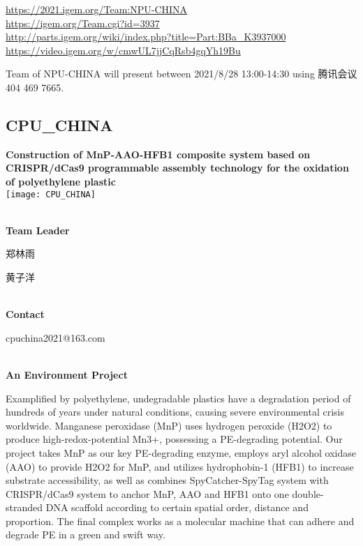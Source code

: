 \url{https://2021.igem.org/Team:NPU-CHINA }\\
\url{https://igem.org/Team.cgi?id=3937 }\\
\url{http://parts.igem.org/wiki/index.php?title=Part:BBa_K3937000 }\\
\url{https://video.igem.org/w/cmwUL7jjCqRsb4gqYh19Bu }\\

\vfill{}









Team of NPU-CHINA will present between      2021/8/28 13:00-14:30   using 腾讯会议 404 469 7665.
\newpage


\subsection{\textcolor{Blu}{ CPU\_CHINA } }
\vspace{5mm}
\begin{center}
\large{
  \textbf{ Construction of MnP-AAO-HFB1 composite system based on CRISPR/dCas9 programmable assembly technology for the oxidation of polyethylene plastic }\\
  \texttt{[image: CPU\_CHINA]}
}
\end{center}
\textbf{\\Team Leader}

  郑林雨

  黄子洋


\textbf{\\Contact}

  cpuchina2021@163.com

\textbf{\\An Environment Project\\}\begin{spacing}{1.5}

Examplified by polyethylene, undegradable plastics have a degradation period of hundreds of years under natural conditions, causing severe environmental crisis worldwide. Manganese peroxidase (MnP) uses hydrogen peroxide (H2O2) to produce high-redox-potential Mn3+, possessing a PE-degrading potential. Our project takes MnP as our key PE-degrading enzyme, employs aryl alcohol oxidase (AAO) to provide H2O2 for MnP, and utilizes hydrophobin-1 (HFB1) to increase substrate accessibility, as well as combines SpyCatcher-SpyTag system with CRISPR/dCas9 system to anchor MnP, AAO and HFB1 onto one double-stranded DNA scaffold according to certain spatial order, distance and proportion. The final complex works as a molecular machine that can adhere and degrade PE in a green and swift way.\end{spacing}
\\

